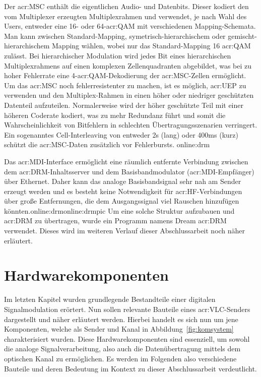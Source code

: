 Der \gls{acr:MSC} enthält die eigentlichen Audio- und Datenbits. Dieser kodiert den vom Multiplexer erzeugten Multiplexrahmen und verwendet, je nach Wahl des Users, entweder eine 16- oder 64-\gls{acr:QAM} mit verschiedenen Mapping-Schemata. Man kann zwischen Standard-Mapping, symetrisch-hierarchischem oder gemischt-hierarchischem Mapping wählen, wobei nur das Standard-Mapping 16 \gls{acr:QAM} zulässt. Bei hierarchischer Modulation wird jedes Bit eines hierarchischen Multiplexrahmens auf einen komplexen Zellenquadranten abgebildet, was bei zu hoher Fehlerrate eine 4-\gls{acr:QAM}-Dekodierung der \gls{acr:MSC}-Zellen ermöglicht. Um das \gls{acr:MSC} noch fehlerresistenter zu machen, ist es möglich, \gls{acr:UEP} zu verwenden und den Multiplex-Rahmen in einen höher oder niedriger geschützten Datenteil aufzuteilen. Normalerweise wird der höher geschützte Teil mit einer höheren Coderate kodiert, was zu mehr Redundanz führt und somit die Wahrscheinlichkeit von Bitfehlern in schlechten Übertragungsszenarien verringert. Ein sogenanntes Cell-Interleaving von entweder 2s (lang) oder 400ms (kurz) schützt die \gls{acr:MSC}-Daten zusätzlich vor Fehlerbursts. \gls{online:drm}

Das \gls{acr:MDI}-Interface ermöglicht eine räumlich entfernte Verbindung zwischen dem \gls{acr:DRM}-Inhaltsserver und dem Basisbandmodulator (\gls{acr:MDI}-Empfänger) über Ethernet. Daher kann das analoge Basisbandsignal sehr nah am Sender erzeugt werden und es besteht keine Notwendigkeit für \gls{acr:HF}-Verbindungen über große Entfernungen, die dem Ausgangssignal viel Rauschen hinzufügen könnten.\gls{online:drm}\gls{online:drmpic} Um eine solche Struktur aufzubauen und \gls{acr:DRM} zu übertragen, wurde ein Programm namens Dream \gls{acr:DRM} verwendet. Dieses wird im weiteren Verlauf dieser Abschlussarbeit noch näher erläutert. 
\newpage
\section{Hardwarekomponenten}
\label{subsec:elbau}
Im letzten Kapitel wurden grundlegende Bestandteile einer digitalen Signalmodulation erörtert. Nun sollen  relevante Bauteile eines \gls{acr:VLC}-Senders dargestellt und näher erläutert werden. Hierbei handelt es sich nun um jene Komponenten, welche als Sender und Kanal in Abbildung~\ref{fig:komsystem} charakterisiert wurden. Diese Hardwarekomponenten sind essenziell, um sowohl die analoge Signalverarbeitung, also auch die Datenübertragung mittels dem optischen Kanal zu ermöglichen. Es werden im Folgenden also verschiedene Bauteile und deren Bedeutung im Kontext zu dieser Abschlussarbeit verdeutlicht.

